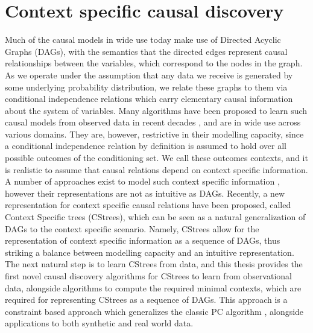 \documentclass{tufte-book}
\begin{document}
\section{Context specific causal discovery}
\label{sec:org13145f1}
Much of the causal models in wide use today make use of Directed Acyclic Graphs (DAGs), with the semantics that the directed edges represent causal relationships between the variables, which correspond to the nodes in the graph. As we operate under the assumption that any data we receive is generated by some underlying probability distribution, we relate these graphs to them via conditional independence relations which carry elementary causal information about the system of variables. Many algorithms have been proposed to learn such causal models from observed data in recent decades \cite{chickering-2002-optimal,spirtes-1991-algor-fast,solus-2021-consis-guaran,tsamardinos-2006-max-min-hill}, and are in wide use across various domains. They are, however, restrictive in their modelling capacity, since a conditional independence relation by definition is assumed to hold over all possible outcomes of the conditioning set. We call these outcomes contexts, and it is realistic to assume that causal relations depend on context specific information. A number of approaches exist to model such context specific information \cite{collazo-2018-chain,silander-2013,thwaites-2010-causal-analy,goergen-2017-equiv-class}, however their representations are not as intuitive as DAGs. Recently, a new representation for context specific causal relations have been proposed, called Context Specific trees (CStrees), which can be seen as a natural generalization of DAGs to the context specific scenario. Namely, CStrees allow for the representation of context specific information as a sequence of DAGs, thus striking a balance between modelling capacity and an intuitive representation. The next natural step is to learn CStrees from data, and this thesis provides the first novel causal discovery algorithms for CStrees to learn from observational data, alongside algorithms to compute the required minimal contexts, which are required for representing CStrees as a sequence of DAGs. This approach is a constraint based approach which generalizes the classic PC algorithm \cite{spirtes-1991-algor-fast}, alongside applications to both synthetic and real world data.
\end{document}
